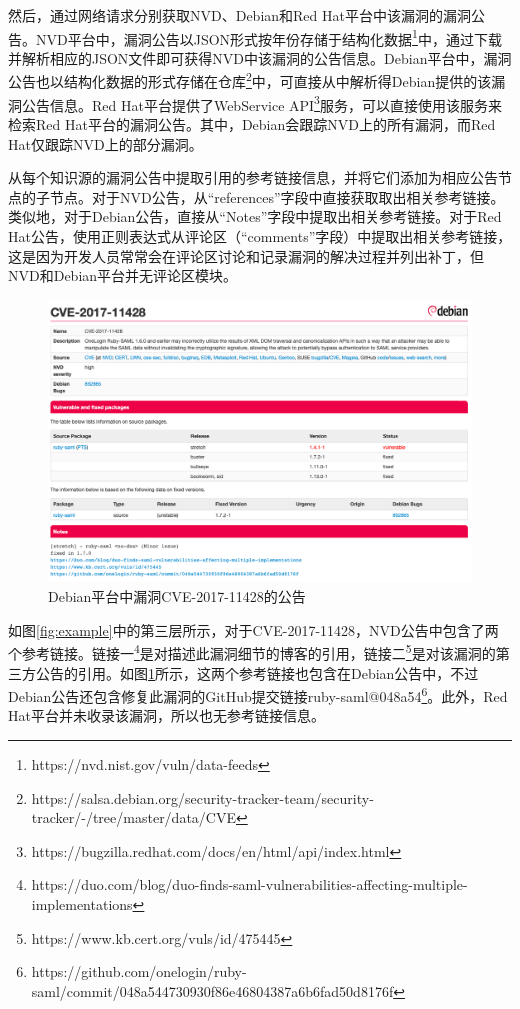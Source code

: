 然后，\tool 通过网络请求分别获取NVD、Debian和Red Hat平台中该漏洞的漏洞公告。NVD平台中，漏洞公告以JSON形式按年份存储于结构化数据\footnote{https://nvd.nist.gov/vuln/data-feeds}中，\tool 通过下载并解析相应的JSON文件即可获得NVD中该漏洞的公告信息。Debian平台中，漏洞公告也以结构化数据的形式存储在仓库\footnote{https://salsa.debian.org/security-tracker-team/security-tracker/-/tree/master/data/CVE}中，\tool 可直接从中解析得Debian提供的该漏洞公告信息。Red Hat平台提供了WebService API\footnote{https://bugzilla.redhat.com/docs/en/html/api/index.html}服务，\tool 可以直接使用该服务来检索Red Hat平台的漏洞公告。其中，Debian会跟踪NVD上的所有漏洞，而Red Hat仅跟踪NVD上的部分漏洞。

\tool 从每个知识源的漏洞公告中提取引用的参考链接信息，并将它们添加为相应公告节点的子节点。对于NVD公告，\tool 从“references”字段中直接获取取出相关参考链接。类似地，对于Debian公告，\tool 直接从“Notes”字段中提取出相关参考链接。对于Red Hat公告，\tool 使用正则表达式从评论区（“comments”字段）中提取出相关参考链接，这是因为开发人员常常会在评论区讨论和记录漏洞的解决过程并列出补丁，但NVD和Debian平台并无评论区模块。

\begin{figure}[!t]
    \centering
    \includegraphics[scale=0.345]{fig/debian-2017-11428}
    \caption{Debian平台中漏洞CVE-2017-11428的公告}\label{fig:debian-2017-11428}
\end{figure}

\begin{exmp}
如图\ref{fig:example}中的第三层所示，对于CVE-2017-11428，NVD公告中包含了两个参考链接。链接一\footnote{https://duo.com/blog/duo-finds-saml-vulnerabilities-affecting-multiple-implementations}是对描述此漏洞细节的博客的引用，链接二\footnote{https://www.kb.cert.org/vuls/id/475445}是对该漏洞的第三方公告的引用。如图\ref{fig:debian-2017-11428}所示，这两个参考链接也包含在Debian公告中，不过Debian公告还包含修复此漏洞的GitHub提交链接ruby-saml@048a54\footnote{https://github.com/onelogin/ruby-saml/commit/048a544730930f86e46804387a6b6fad50d8176f}。此外，Red Hat平台并未收录该漏洞，所以也无参考链接信息。
\end{exmp}

